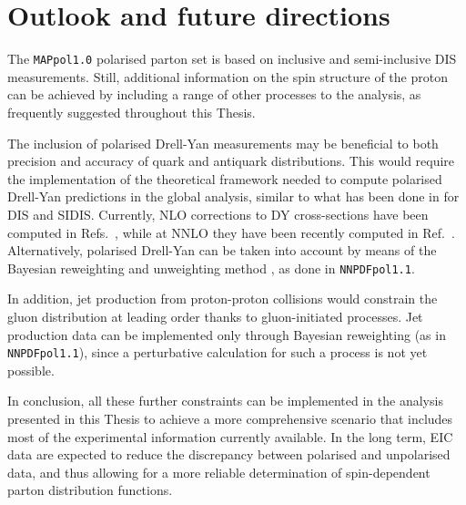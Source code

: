 \section{Outlook and future directions}
%
The \texttt{MAPpol1.0} polarised parton set is based on inclusive and semi-inclusive DIS measurements. Still, additional information on the spin structure of the proton can be achieved by including a range of other processes to the analysis, as frequently suggested throughout this Thesis.%

The inclusion of polarised Drell-Yan measurements may be beneficial to both precision and accuracy of quark and antiquark distributions. This would require the implementation of the theoretical framework needed to compute polarised Drell-Yan predictions in the global analysis, similar to what has been done in  for DIS and SIDIS. Currently, NLO corrections to DY cross-sections have been computed in Refs.~\cite{Gehrmann:1997ez,Bonvini:2010tp}, while at NNLO they have been recently computed in Ref.~\cite{Boughezal:2021wjw}. Alternatively, polarised Drell-Yan can be taken into account by means of the Bayesian reweighting and unweighting method \cite{Ball:2010gb, Ball:2011gg}, as done in \texttt{NNPDFpol1.1}.%

In addition, jet production from proton-proton collisions would constrain the gluon distribution at leading order thanks to gluon-initiated processes. Jet production data can be implemented only through Bayesian reweighting (as in \texttt{NNPDFpol1.1}), since a perturbative calculation for such a process is not yet possible.%

In conclusion, all these further constraints can be implemented in the analysis presented in this Thesis to achieve a more comprehensive scenario that includes most of the experimental information currently available. In the long term, EIC data are expected to reduce the discrepancy between polarised and unpolarised data, and thus allowing for a more reliable determination of spin-dependent parton distribution functions.